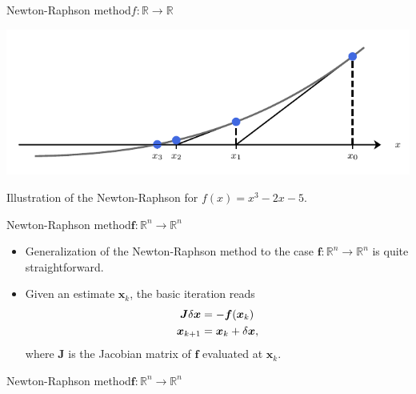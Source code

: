 \documentclass[usenames,dvipsnames,svgnames,10pt,aspectratio=169]{beamer}
\begin{document}
\begin{frame}[t, c]{Newton-Raphson method}{$f : \mathbb{R} \to \mathbb{R}$}
	\centering

	\includegraphics[width=.75\textwidth]{Newton_method}

	\bigskip

	Illustration of the Newton-Raphson for $f(x) = x^3 - 2x - 5$.

	\vspace{1cm}
\end{frame}


\begin{frame}[t, c]{Newton-Raphson method}{${\bm f} : \mathbb{R}^n \to \mathbb{R}^n$}

	\begin{itemize}
		\item Generalization of the Newton-Raphson method to the case ${\bm f} : \mathbb{R}^n \to \mathbb{R}^n$ is quite straightforward.

		\bigskip

		\item Given an estimate ${\bm x}_k$, the basic iteration reads
		\begin{equation}
			\begin{aligned}
				{\bm J} \delta {\bm x} & = - {\bm f}({\bm x}_k) \\
				{\bm x}_{k+1} & = {\bm x}_k + \delta {\bm x},
			\end{aligned}
			\notag
		\end{equation}
		where ${\bm J}$ is the Jacobian matrix of ${\bm f}$ evaluated at ${\bm x}_k$.
	\end{itemize}

	\vspace{1cm}
\end{frame}

\begin{frame}[t, c]{Newton-Raphson method}{${\bm f} : \mathbb{R}^n \to \mathbb{R}^n$}

\end{frame}
\end{document}
